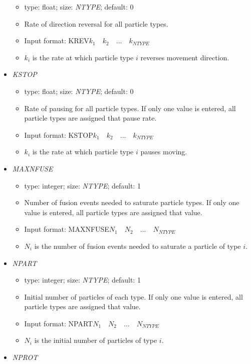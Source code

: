 \documentclass[12pt]{article}
\begin{document}
\begin{itemize}
\begin{itemize}
		\item  type: float; size: \textit{NTYPE}; default: 0
		\item Rate of direction reversal for all particle types. 
		\item Input format: KREV\quad$k_{1}\quad k_{2}\quad...\quad k_{NTYPE}$
		\item $k_{i}$ is the rate at which particle type $i$ reverses movement direction.
	\end{itemize}
%
\item {\it KSTOP}
	\begin{itemize}
		\item  type: float; size: \textit{NTYPE}; default: 0
		\item Rate of pausing for all particle types. If only one value is entered, all particle types are assigned that pause rate. 
		\item Input format: KSTOP\quad$k_{1}\quad k_{2}\quad...\quad k_{NTYPE}$
		\item $k_{i}$ is the rate at which particle type $i$ pauses moving.
	\end{itemize}
%
\item {\it MAXNFUSE}
	\begin{itemize}
		\item  type: integer; size: \textit{NTYPE}; default: 1
		\item Number of fusion events needed to saturate particle types. If only one value is entered, all particle types are assigned that value.
		\item Input format: MAXNFUSE\quad$N_{1}\quad N_{2}\quad...\quad N_{NTYPE}$
		\item $N_{i}$ is the number of fusion events needed to saturate a particle of type $i$.
	\end{itemize}  
%
\item {\it NPART}
	\begin{itemize}
		\item  type: integer; size: \textit{NTYPE}; default: 1
		\item Initial number of particles of each type. If only one value is entered, all particle types are assigned that value.
		\item Input format: NPART\quad$N_{1}\quad N_{2}\quad...\quad N_{NTYPE}$
		\item $N_{i}$ is the initial number of particles of type $i$.
	\end{itemize}   
%
\item {\it NPROT}
	\begin{itemize}

\end{itemize}
\end{itemize}
\end{document}
